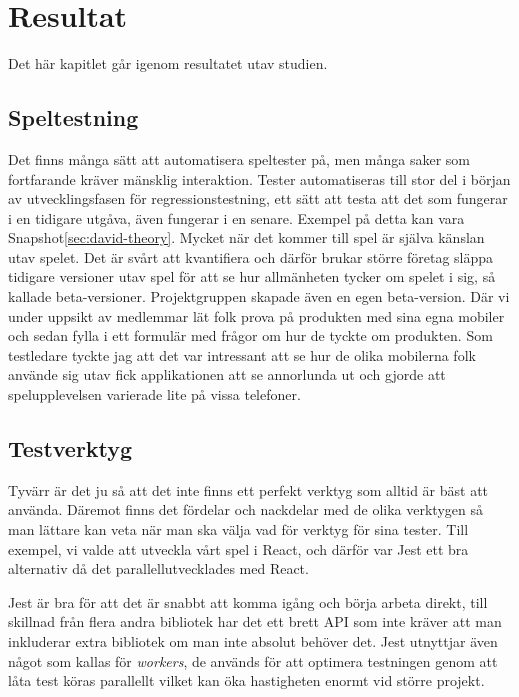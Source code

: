 \section{Resultat}
\label{sec:david-results}
Det här kapitlet går igenom resultatet utav studien.

\subsection{Speltestning}
Det finns många sätt att automatisera speltester på, men många saker som fortfarande kräver mänsklig interaktion. Tester automatiseras till stor del i början av utvecklingsfasen för regressionstestning, ett sätt att testa att det som fungerar i en tidigare utgåva, även fungerar i en senare. Exempel på detta kan vara Snapshot\ref{sec:david-theory}. Mycket när det kommer till spel är själva känslan utav spelet. Det är svårt att kvantifiera och därför brukar större företag släppa tidigare versioner utav spel för att se hur allmänheten tycker om spelet i sig, så kallade beta-versioner. Projektgruppen skapade även en egen beta-version. Där vi under uppsikt av medlemmar lät folk prova på produkten med sina egna mobiler och sedan fylla i ett formulär med frågor om hur de tyckte om produkten. Som testledare tyckte jag att det var intressant att se hur de olika mobilerna folk använde sig utav fick applikationen att se annorlunda ut och gjorde att spelupplevelsen varierade lite på vissa telefoner.

\subsection{Testverktyg}
Tyvärr är det ju så att det inte finns ett perfekt verktyg som alltid är bäst att använda. Däremot finns det fördelar och nackdelar med de olika verktygen så man lättare kan veta när man ska välja vad för verktyg för sina tester. Till exempel, vi valde att utveckla vårt spel i React, och därför var Jest ett bra alternativ då det parallellutvecklades med React. 

Jest är bra för att det är snabbt att komma igång och börja arbeta direkt, till skillnad från flera andra bibliotek har det ett brett API som inte kräver att man inkluderar extra bibliotek om man inte absolut behöver det. Jest utnyttjar även något som kallas för \textit{workers}, de används för att optimera testningen genom att låta test köras parallellt vilket kan öka hastigheten enormt vid större projekt.